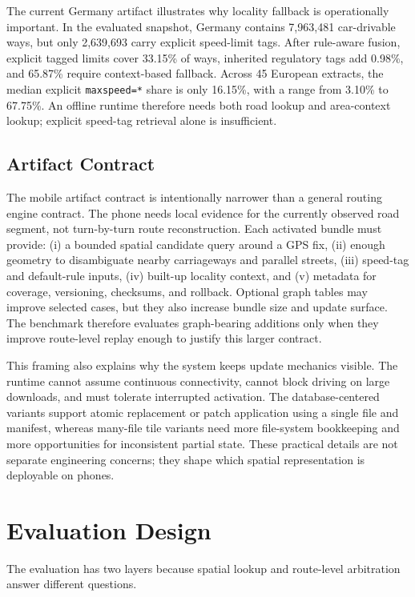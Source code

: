 \documentclass[sigconf]{acmart}
\begin{document}
The current Germany artifact illustrates why locality fallback is operationally important. In the evaluated snapshot, Germany contains 7,963,481 car-drivable ways, but only 2,639,693 carry explicit speed-limit tags. After rule-aware fusion, explicit tagged limits cover 33.15\% of ways, inherited regulatory tags add 0.98\%, and 65.87\% require context-based fallback. Across 45 European extracts, the median explicit \texttt{maxspeed=*} share is only 16.15\%, with a range from 3.10\% to 67.75\%. An offline runtime therefore needs both road lookup and area-context lookup; explicit speed-tag retrieval alone is insufficient.

\subsection{Artifact Contract}

The mobile artifact contract is intentionally narrower than a general routing engine contract. The phone needs local evidence for the currently observed road segment, not turn-by-turn route reconstruction. Each activated bundle must provide: (i) a bounded spatial candidate query around a GPS fix, (ii) enough geometry to disambiguate nearby carriageways and parallel streets, (iii) speed-tag and default-rule inputs, (iv) built-up locality context, and (v) metadata for coverage, versioning, checksums, and rollback. Optional graph tables may improve selected cases, but they also increase bundle size and update surface. The benchmark therefore evaluates graph-bearing additions only when they improve route-level replay enough to justify this larger contract.

This framing also explains why the system keeps update mechanics visible. The runtime cannot assume continuous connectivity, cannot block driving on large downloads, and must tolerate interrupted activation. The database-centered variants support atomic replacement or patch application using a single file and manifest, whereas many-file tile variants need more file-system bookkeeping and more opportunities for inconsistent partial state. These practical details are not separate engineering concerns; they shape which spatial representation is deployable on phones.

\section{Evaluation Design}

The evaluation has two layers because spatial lookup and route-level arbitration answer different questions.
\end{document}
